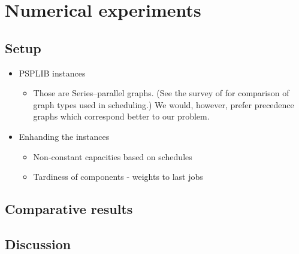 \chapter{Numerical experiments}

\section{Setup}

\begin{itemize}
    \item PSPLIB instances
    \begin{itemize}
        \item Those are Series–parallel graphs.
            (See the survey of \citep{PROT2017} for comparison of graph types used in scheduling.)
            We would, however, prefer precedence graphs which correspond better to our problem.
    \end{itemize}

    \item Enhanding the instances
    \begin{itemize}
        \item Non-constant capacities based on schedules
        \item Tardiness of components - weights to last jobs
    \end{itemize}
\end{itemize}

\section{Comparative results}

\section{Discussion}
